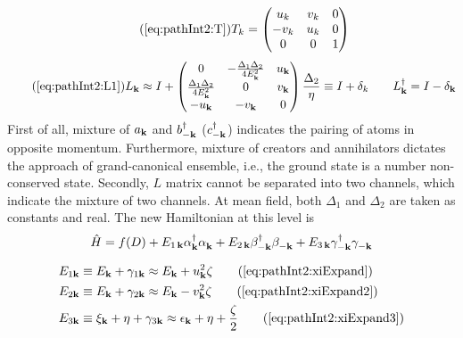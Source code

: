 \begin{equation}\tag{\ref{eq:pathInt2:T}}
T_k=\mtrx{u_k&v_k&0\\-v_k&u_k&0\\0&0&1}
\end{equation}
\begin{equation}\tag{\ref{eq:pathInt2:L1}}
L_{\vk}\approx{}I+
\mtrx{0&-\frac{\Delta_{1}{}\Delta_{2}{}}{4E^{2}_{\vk}}&u_{\vk}\\
\frac{\Delta_{1}{}\Delta_{2}{}}{4E^{2}_{\vk}}&0&v_{\vk}\\
-u_{\vk}&-v_{\vk}&0
}\frac{\Delta_{2}{}}{\eta}
\equiv{}I+\delta_{k}\qquad
L^{\dg}_{\vk}=I-\delta_{\vk}
\end{equation}
First of all, mixture of $a_{\mathbf{k}}$ and $b^{\dagger}_{-\mathbf{k}}$ ($c^{\dagger}_{-\mathbf{k}}$) indicates the pairing of atoms in opposite momentum. Furthermore,   mixture of creators and annihilators dictates the approach of grand-canonical ensemble, i.e., the ground state is a number non-conserved state.   Secondly, $L$ matrix cannot be separated into two channels, which indicate the mixture of two channels.   At mean field, both $\Delta_{1}$ and $\Delta_{2}$ are taken as constants and real.  The new Hamiltonian at this level is 
\begin{equation}
\hat{H}=f(D)+E_{1\,\mathbf{k}}\alpha^{\dagger}_{\mathbf{k}}\alpha^{}_{\mathbf{k}}
+E_{2\,\mathbf{k}}\beta^{\dagger}_{-\mathbf{k}}\beta^{}_{-\mathbf{k}}+E_{3\,\mathbf{k}}\gamma^{\dagger}_{-\mathbf{k}}\gamma^{}_{-\mathbf{k}}
\end{equation}

\begin{align}
E_{1\vk}&\equiv{}E_{\vk}+\gamma_{1\vk}\approx{}E_{\vk}+u_{\vk}^{2}\zeta\tag{\ref{eq:pathInt2:xiExpand}}\\
E_{2\vk}&\equiv{}E_{\vk}+\gamma_{2\vk}
\approx{}E_{\vk}-v_{\vk}^{2}\zeta\tag{\ref{eq:pathInt2:xiExpand2}}\\
E_{3\vk}&\equiv{}\xi_{\vk}+\eta+\gamma_{3\vk}\approx{}\epsilon_{\vk}+\eta+\frac{\zeta}{2}
\tag{\ref{eq:pathInt2:xiExpand3}}
\end{align}


